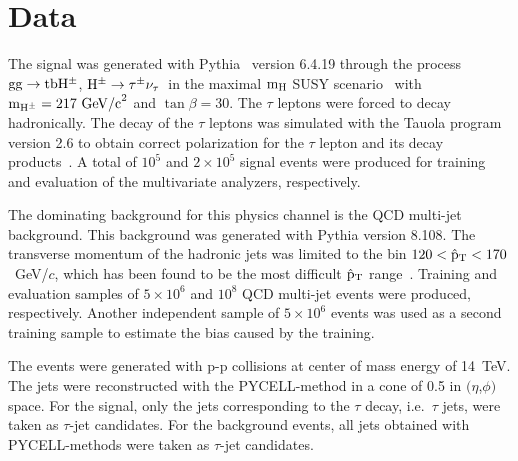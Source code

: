 \documentclass[a4paper]{jpconf}
\newcommand{\Hplustaunu}{\mbox{${\rm H}^{\pm} \to \tau^{\pm}\nu_{\tau}$}}
\begin{document}
\section{Data}\label{sec:data}
The signal was generated with Pythia~\cite{pythia} version 6.4.19
through the process ${\rm gg} \to {\rm tbH^\pm}$,
\Hplustaunu\ in the maximal 
${\rm m}_{\rm H}$ SUSY scenario~\cite{maxsusy} with 
${\rm m}_{{\rm H}^{\pm}}=217~{\rm GeV/c}^2$ and $\tan\beta = 30$.
The $\tau$ leptons were forced to decay hadronically. The decay of the
$\tau$ leptons was simulated with the Tauola program~\cite{tauola}
version 2.6 to obtain correct polarization for the $\tau$ lepton and
its decay products~\cite{taupolarization}. 
A total of $10^5$ and $2\times 10^5$ signal events were produced for training and evaluation of the
multivariate analyzers, respectively.

The dominating background for this physics channel is the QCD
multi-jet background. This background was generated with 
Pythia version 8.108. The transverse momentum of the hadronic jets was
limited to the bin $120 < \hat{\rm p}_{\rm T} < 170$~GeV/$c$, which
has been found to be the most difficult $\hat{\rm p}_{\rm T}$
range~\cite{ptdrII}. Training and evaluation samples of $5\times 10^6$
and $10^8$ QCD multi-jet events were produced, respectively. 
Another independent sample of $5\times 10^6$ events was used as a second
training sample to estimate the bias caused by the training.

The events were generated with p-p collisions at center of mass energy
of 14~TeV. The jets were reconstructed with the PYCELL-method in a
cone of 0.5 in $(\eta$,$\phi)$ space. For the signal, only the jets
corresponding to the $\tau$ decay, i.e.~$\tau$ jets, 
were taken as $\tau$-jet candidates. 
For the background events, all jets obtained with PYCELL-methods were taken as $\tau$-jet candidates.
\end{document}
